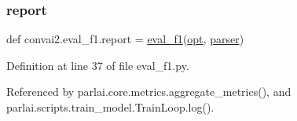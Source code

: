 \subsubsection{\texorpdfstring{report}{report}}
{\footnotesize\ttfamily def convai2.\+eval\+\_\+f1.\+report = \hyperlink{namespaceconvai2_1_1eval__f1_afe542e92a9299437c24ee9d9004ecf0a}{eval\+\_\+f1}(\hyperlink{namespaceconvai2_1_1eval__f1_aba7ce275c4164636cfb6e4cd9a6ea52b}{opt}, \hyperlink{namespaceconvai2_1_1eval__f1_aeaae38a7efddce95c973c6c07f684b24}{parser})}



Definition at line 37 of file eval\+\_\+f1.\+py.



Referenced by parlai.\+core.\+metrics.\+aggregate\+\_\+metrics(), and parlai.\+scripts.\+train\+\_\+model.\+Train\+Loop.\+log().


